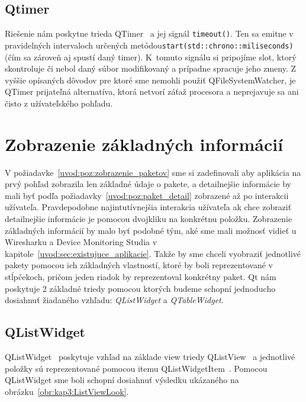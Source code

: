 \subsection*{Qtimer}
Riešenie nám poskytne trieda QTimer~\cite{qtimer} a jej signál \texttt{timeout()}. Ten sa emitne v pravidelných intervaloch určených metódou\newline \texttt{start(std::chrono::miliseconds)} (čím sa zároveň aj spustí daný timer). K~tomuto signálu si pripojíme slot, ktorý skontroluje či nebol daný súbor modifikovaný a prípadne spracuje jeho zmeny. Z vyššie opísaných dôvodov pre ktoré sme nemohli použiť QFileSystemWatcher, je QTimer prijateľná alternatíva, ktorá netvorí záťaž procesora a neprejavuje sa ani čisto z užívateľského pohľadu.



\section{Zobrazenie základných informácií}
\label{kap03:sec:zobr_zakl}
V požiadavke~\ref{uvod:poz:zobrazenie_paketov} sme si zadefinovali aby aplikácia na prvý pohľad zobrazila len základné údaje o pakete, a detailnejšie informácie by mali byť podľa požiadavky~\ref{uvod:poz:paket_detail} zobrazené až po interakcii užívateľa. Pravdepodobne najintutívnejšia interakcia užívateľa ak chce zobraziť detailnejšie informácie je pomocou dvojkliku na konkrétnu položku. Zobrazenie základných informácií by malo byť podobné tým, aké sme mali možnosť vidieť u Wiresharku a Device Monitoring Studia v kapitole~\ref{uvod:sec:existujuce_aplikacie}. Takže by sme chceli vyobraziť jednotlivé pakety pomocou ich základných vlastností, ktoré by boli reprezentované v stĺpčekoch, pričom jeden riadok by reprezentoval konkrétny paket. Qt nám poskytuje 2 základné triedy pomocou ktorých budeme schopní jednoducho dosiahnuť žiadaného vzhľadu: \textit{QListWidget} a \textit{QTableWidget}.

\subsection*{QListWidget}
QListWidget~\cite{qlistwidget} poskytuje vzhľad na základe view triedy QListView~\cite{qlistview} a jednotlivé položky sú reprezentované pomocou itemu QListWidgetItem~\cite{qlistwidgetitem}. Pomocou QListWidget sme boli schopní dosiahnuť výsledku ukázaného na obrázku~\ref{obr:kap3:ListViewLook}.

